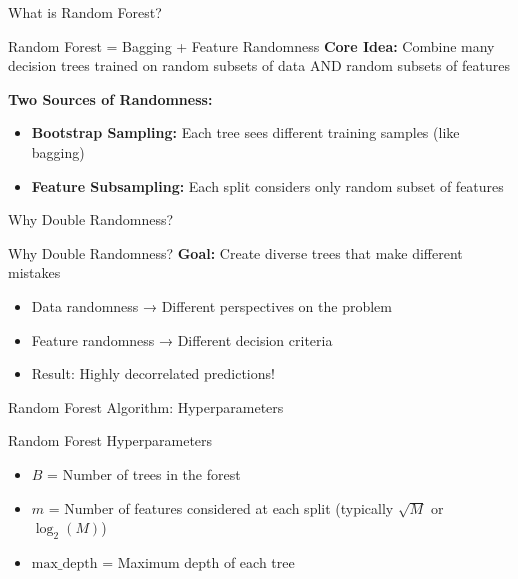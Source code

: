 \documentclass[10pt]{beamer}
\begin{document}
\begin{frame}{What is Random Forest?}
\begin{definitionbox}{Random Forest = Bagging + Feature Randomness}
\textbf{Core Idea:} Combine many decision trees trained on random subsets of data AND random subsets of features
\end{definitionbox}

\begin{keypointsbox}
\textbf{Two Sources of Randomness:}
\begin{itemize}
\item \textbf{Bootstrap Sampling:} Each tree sees different training samples (like bagging)
\item \textbf{Feature Subsampling:} Each split considers only random subset of features
\end{itemize}
\end{keypointsbox}
\end{frame}

\begin{frame}{Why Double Randomness?}
\begin{examplebox}{Why Double Randomness?}
\textbf{Goal:} Create diverse trees that make different mistakes
\begin{itemize}
\item Data randomness → Different perspectives on the problem
\item Feature randomness → Different decision criteria
\item Result: Highly decorrelated predictions!
\end{itemize}
\end{examplebox}
\end{frame}

\begin{frame}{Random Forest Algorithm: Hyperparameters}
\begin{definitionbox}{Random Forest Hyperparameters}
\begin{itemize}
\item $B$ = Number of trees in the forest
\item $m$ = Number of features considered at each split (typically $\sqrt{M}$ or $\log_2(M)$)
\item $\text{max\_depth}$ = Maximum depth of each tree
\end{itemize}
\end{definitionbox}
\end{frame}
\end{document}
